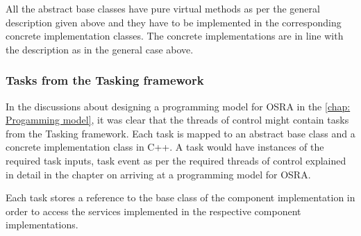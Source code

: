 All the abstract base classes have pure virtual methods as per the general description given above and they have to be implemented in the corresponding concrete implementation classes. The concrete implementations are in line with the description as in the general case above.

\subsubsection{\textbf{Tasks from the Tasking framework}}
In the discussions about designing a programming model for OSRA in the \cref{chap: Progamming model}, it was clear that the threads of control might contain tasks from the Tasking framework. Each task is mapped to an abstract base class and a concrete implementation class in C++. A task would have instances of the required task inputs, task event as per the required threads of control explained in detail in the chapter on arriving at a programming model for OSRA.

Each task stores a reference to the base class of the component implementation in order to access the services implemented in the respective component implementations.  


